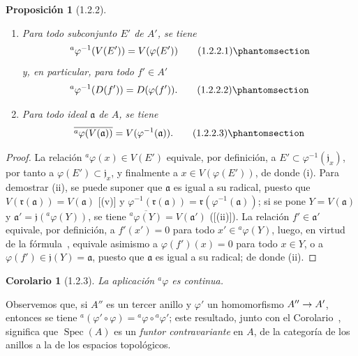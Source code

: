 \documentclass[oneside]{amsart}
\theoremstyle{ega-env-style}
\theoremstyle{ega-thm-env-style}
\newtheorem*{proposition}{Proposición}
\newtheorem*{corollary}{Corolario}
\theoremstyle{ega-defn-env-style}
\renewcommand{\to}{\mathchoice{\longrightarrow}{\rightarrow}{\rightarrow}{\rightarrow}}
\let\EGAOriginalLabel\label
\renewcommand{\label}[1]{\phantomsection\EGAOriginalLabel{#1}}
\begin{document}
\begin{proposition}[1.2.2]
\label{I.1.2.2}
\medskip\noindent
\begin{enumerate}
  \item[{\rm(i)}] Para todo subconjunto $E'$ de $A'$, se tiene
    \begin{equation}
    {}^a\varphi^{-1}(V(E'))=V(\varphi(E'))
    \tag{1.2.2.1}\label{I.1.2.2.1-fr}
  \end{equation}
    y, en particular, para todo $f'\in A'$
    \begin{equation}
    {}^a\varphi^{-1}(D(f'))=D(\varphi(f')).
    \tag{1.2.2.2}\label{I.1.2.2.2-fr}
  \end{equation}
  \item[{\rm(ii)}] Para todo ideal $\mathfrak{a}$ de $A$, se tiene
    \begin{equation}
    \overline{{}^a\varphi(V(\mathfrak{a}))}
    =V(\varphi^{-1}(\mathfrak{a})).
    \tag{1.2.2.3}\label{I.1.2.2.3-fr}
  \end{equation}
\end{enumerate}
\end{proposition}

\begin{proof}
La relación ${}^a\varphi(x)\in V(E')$ equivale, por definición, a $E'\subset\varphi^{-1}(\mathfrak{j}_x)$, por tanto a $\varphi(E')\subset\mathfrak{j}_x$, y finalmente a $x\in V(\varphi(E'))$, de donde (i).
Para demostrar (ii), se puede suponer que $\mathfrak{a}$ es igual a su radical, puesto que $V(\mathfrak{r}(\mathfrak{a}))=V(\mathfrak{a})$ [(v)] y $\varphi^{-1}(\mathfrak{r}(\mathfrak{a}))
=\mathfrak{r}(\varphi^{-1}(\mathfrak{a}))$;
si se pone $Y=V(\mathfrak{a})$ y $\mathfrak{a}'=\mathfrak{j}({}^a\varphi(Y))$, se tiene $\overline{{}^a\varphi(Y)}=V(\mathfrak{a}')$ ([(ii)]).
La relación $f'\in\mathfrak{a}'$ equivale, por definición, a $f'(x')=0$ para todo $x'\in{}^a\varphi(Y)$, luego, en virtud de la fórmula~, equivale asimismo a $\varphi(f')(x)=0$ para todo $x\in Y$, o a $\varphi(f')\in\mathfrak{j}(Y)=\mathfrak{a}$, puesto que $\mathfrak{a}$ es igual a su radical;
de donde (ii).
\end{proof}

\begin{corollary}[1.2.3]
\label{I.1.2.3}
La aplicación ${}^a\varphi$ es continua.
\end{corollary}

Observemos que, si $A''$ es un tercer anillo y $\varphi'$ un homomorfismo $A''\to A'$, entonces se tiene ${}^a(\varphi'\circ\varphi)={}^a\varphi\circ{}^a\varphi'$;
este resultado, junto con el Corolario~, significa que $\operatorname{Spec}(A)$ es un \emph{funtor contravariante} en $A$, de la categoría de los anillos a la de los espacios topológicos.
\end{document}
